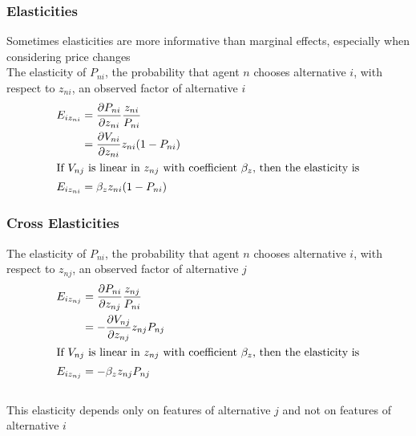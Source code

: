 \documentclass{beamer}
\begin{document}
\begin{frame}\frametitle{Elasticities}
    Sometimes elasticities are more informative than marginal effects, especially when considering price changes \\
    \vspace{3ex}
    The elasticity of $P_{ni}$, the probability that agent $n$ chooses alternative $i$, with respect to $z_{ni}$, an observed factor of alternative $i$
    \begin{align*}
    	E_{iz_{ni}} &= \frac{\partial P_{ni}}{\partial z_{ni}} \frac{z_{ni}}{P_{ni}} \\
    	&= \frac{\partial V_{ni}}{\partial z_{ni}} z_{ni} (1 - P_{ni}) \\
    	\intertext{If $V_{nj}$ is linear in $z_{nj}$ with coefficient $\beta_z$, then the elasticity is}
    	E_{iz_{ni}} &= \beta_z z_{ni} (1 - P_{ni})
    \end{align*}
\end{frame}

\begin{frame}\frametitle{Cross Elasticities}
    The elasticity of $P_{ni}$, the probability that agent $n$ chooses alternative $i$, with respect to $z_{nj}$, an observed factor of alternative $j$
    \begin{align*}
    	E_{iz_{nj}} &= \frac{\partial P_{ni}}{\partial z_{nj}} \frac{z_{nj}}{P_{ni}} \\
    	&= -\frac{\partial V_{nj}}{\partial z_{nj}} z_{nj} P_{nj} \\
    	\intertext{If $V_{nj}$ is linear in $z_{nj}$ with coefficient $\beta_z$, then the elasticity is}
    	E_{iz_{nj}} &= -\beta_z z_{nj} P_{nj}
    \end{align*} \\
    \vspace{1ex}
    This elasticity depends only on features of alternative $j$ and not on features of alternative $i$
\end{frame}
\end{document}
